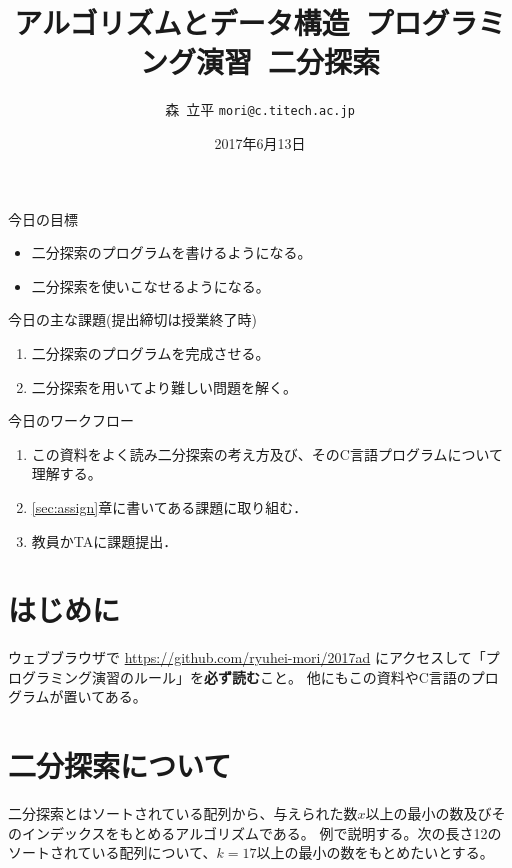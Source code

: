 \documentclass[a4paper,twoside,onecolumn,openany,article,10pt]{memoir}
\title{アルゴリズムとデータ構造~プログラミング演習~二分探索}
\date{2017年6月13日}
\author{森~立平 \texttt{mori@c.titech.ac.jp}}
\theoremstyle{remark}
\begin{document}
\maketitle


\noindent
今日の目標
\begin{itemize}
\item 二分探索のプログラムを書けるようになる。
\item 二分探索を使いこなせるようになる。
\end{itemize}

\noindent
今日の主な課題(提出締切は授業終了時)
\begin{enumerate}
\item 二分探索のプログラムを完成させる。
\item 二分探索を用いてより難しい問題を解く。
\end{enumerate}

\noindent
今日のワークフロー
\begin{enumerate}
\item この資料をよく読み二分探索の考え方及び、そのC言語プログラムについて理解する。
\item \ref{sec:assign}章に書いてある課題に取り組む．
\item 教員かTAに課題提出．
\end{enumerate}

\section{はじめに}
ウェブブラウザで \url{https://github.com/ryuhei-mori/2017ad} にアクセスして「プログラミング演習のルール」を\textbf{必ず読む}こと。
他にもこの資料やC言語のプログラムが置いてある。


\section{二分探索について}
二分探索とはソートされている配列から、与えられた数$x$以上の最小の数及びそのインデックスをもとめるアルゴリズムである。
例で説明する。次の長さ12のソートされている配列について、$k=17$以上の最小の数をもとめたいとする。
\end{document}
